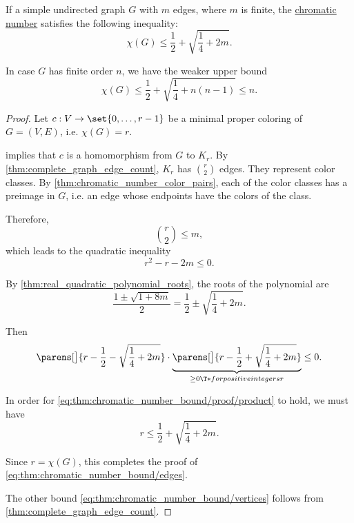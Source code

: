 \begin{proposition}\label{thm:chromatic_number_bound}
  If a simple undirected graph \( G \) with \( m \) edges, where \( m \) is finite, the \hyperref[def:graph_chromatic_number]{chromatic number} satisfies the following inequality:
  \begin{equation}\label{eq:thm:chromatic_number_bound/edges}
    \chi(G) \leq \frac 1 2 + \sqrt{ \frac 1 4 + 2m }.
  \end{equation}

  In case \( G \) has finite order \( n \), we have the weaker upper bound
  \begin{equation}\label{eq:thm:chromatic_number_bound/vertices}
    \chi(G) \leq \frac 1 2 + \sqrt{ \frac 1 4 + n(n - 1) } \leq n.
  \end{equation}
\end{proposition}
\begin{proof}
  Let \( c: V \to \set{ 0, \ldots, r - 1 } \) be a minimal proper coloring of \( G = (V, E) \), i.e. \( \chi(G) = r \).

   implies that \( c \) is a homomorphism from \( G \) to \( K_r \). By \cref{thm:complete_graph_edge_count}, \( K_r \) has \( \binom r 2 \) edges. They represent color classes. By \cref{thm:chromatic_number_color_pairs}, each of the color classes has a preimage in \( G \), i.e. an edge whose endpoints have the colors of the class.

  Therefore,
  \begin{equation*}
    \binom r 2 \leq m,
  \end{equation*}
  which leads to the quadratic inequality
  \begin{equation*}
    r^2 - r - 2m \leq 0.
  \end{equation*}

  By \cref{thm:real_quadratic_polynomial_roots}, the roots of the polynomial are
  \begin{equation*}
    \frac { 1 \pm \sqrt{ 1 + 8m } } 2 = \frac 1 2 \pm \sqrt{ \frac 1 4 + 2m }.
  \end{equation*}

  Then
  \begin{equation}\label{eq:thm:chromatic_number_bound/proof/product}
    \parens[\big]{ r - \frac 1 2 - \sqrt{ \frac 1 4 + 2m } } \cdot \underbrace{\parens[\big]{ r - \frac 1 2 + \sqrt{ \frac 1 4 + 2m } }}_{\geq 0 \T*{for positive integers} r} \leq 0.
  \end{equation}

  In order for \eqref{eq:thm:chromatic_number_bound/proof/product} to hold, we must have
  \begin{equation*}
    r \leq \frac 1 2 + \sqrt{ \frac 1 4 + 2m }.
  \end{equation*}

  Since \( r = \chi(G) \), this completes the proof of \eqref{eq:thm:chromatic_number_bound/edges}.

  The other bound \eqref{eq:thm:chromatic_number_bound/vertices} follows from \cref{thm:complete_graph_edge_count}.
\end{proof}

